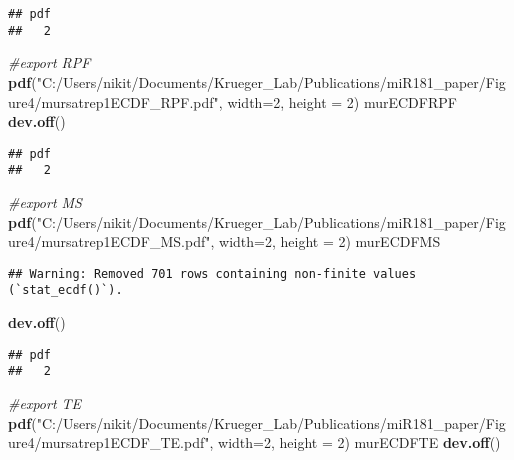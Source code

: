 \documentclass[
]{article}
\newenvironment{Shaded}{\begin{snugshade}}{\end{snugshade}}
\newcommand{\AttributeTok}[1]{\textcolor[rgb]{0.13,0.29,0.53}{#1}}
\newcommand{\CommentTok}[1]{\textcolor[rgb]{0.56,0.35,0.01}{\textit{#1}}}
\newcommand{\DecValTok}[1]{\textcolor[rgb]{0.00,0.00,0.81}{#1}}
\newcommand{\FunctionTok}[1]{\textcolor[rgb]{0.13,0.29,0.53}{\textbf{#1}}}
\newcommand{\NormalTok}[1]{#1}
\newcommand{\StringTok}[1]{\textcolor[rgb]{0.31,0.60,0.02}{#1}}
\begin{document}
\begin{verbatim}
## pdf 
##   2
\end{verbatim}

\begin{Shaded}
\begin{Highlighting}[]
\CommentTok{\#export RPF}
\FunctionTok{pdf}\NormalTok{(}\StringTok{"C:/Users/nikit/Documents/Krueger\_Lab/Publications/miR181\_paper/Figure4/mursatrep1ECDF\_RPF.pdf"}\NormalTok{, }\AttributeTok{width=}\DecValTok{2}\NormalTok{, }\AttributeTok{height =} \DecValTok{2}\NormalTok{)}
\NormalTok{murECDFRPF}
\FunctionTok{dev.off}\NormalTok{()}
\end{Highlighting}
\end{Shaded}

\begin{verbatim}
## pdf 
##   2
\end{verbatim}

\begin{Shaded}
\begin{Highlighting}[]
\CommentTok{\#export MS}
\FunctionTok{pdf}\NormalTok{(}\StringTok{"C:/Users/nikit/Documents/Krueger\_Lab/Publications/miR181\_paper/Figure4/mursatrep1ECDF\_MS.pdf"}\NormalTok{, }\AttributeTok{width=}\DecValTok{2}\NormalTok{, }\AttributeTok{height =} \DecValTok{2}\NormalTok{)}
\NormalTok{murECDFMS}
\end{Highlighting}
\end{Shaded}

\begin{verbatim}
## Warning: Removed 701 rows containing non-finite values (`stat_ecdf()`).
\end{verbatim}

\begin{Shaded}
\begin{Highlighting}[]
\FunctionTok{dev.off}\NormalTok{()}
\end{Highlighting}
\end{Shaded}

\begin{verbatim}
## pdf 
##   2
\end{verbatim}

\begin{Shaded}
\begin{Highlighting}[]
\CommentTok{\#export TE}
\FunctionTok{pdf}\NormalTok{(}\StringTok{"C:/Users/nikit/Documents/Krueger\_Lab/Publications/miR181\_paper/Figure4/mursatrep1ECDF\_TE.pdf"}\NormalTok{, }\AttributeTok{width=}\DecValTok{2}\NormalTok{, }\AttributeTok{height =} \DecValTok{2}\NormalTok{)}
\NormalTok{murECDFTE}
\FunctionTok{dev.off}\NormalTok{()}
\end{Highlighting}
\end{Shaded}
\end{document}
